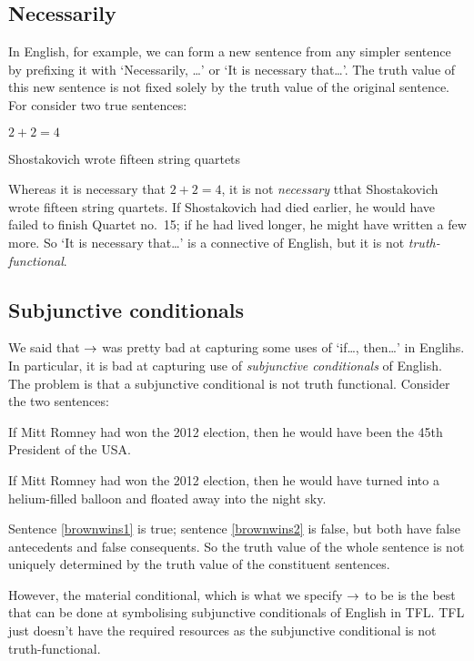 \subsection{Necessarily}

In English, for example, we can form a new sentence from any simpler sentence by prefixing it with `Necessarily, \ldots' or  `It is necessary that\ldots'. The truth value of this new sentence is not fixed solely by the truth value of the original sentence. For consider two true sentences:
\begin{earg}
	\item[\ex{nec-math}] $2 + 2 = 4$
	\item[\ex{nec-music}] Shostakovich wrote fifteen string quartets
\end{earg}
Whereas it is necessary that $2 + 2 = 4$, it is not \emph{necessary} tthat Shostakovich wrote fifteen string quartets. If Shostakovich had died earlier, he would have failed to finish Quartet no.\ 15; if he had lived longer, he might have written a few more. So `It is necessary that\ldots' is a connective of English, but it is not \emph{truth-functional}.



\subsection{Subjunctive conditionals}\label{s:IndicativeSubjunctive}



We said that $\rightarrow$ was pretty bad at capturing some uses of `if\ldots, then\ldots' in Englihs. In particular, it is bad at capturing use of \emph{subjunctive conditionals} of English. The problem is that a subjunctive conditional is not truth functional.
Consider the two sentences:
\begin{earg}
	\item[\ex{brownwins1}] If Mitt Romney had won the 2012 election, then he would have been the 45th President of the USA.
	\item[\ex{brownwins2}] If Mitt Romney had won the 2012 election, then he would have turned into a helium-filled balloon and floated away into the night sky.
\end{earg}
Sentence \ref{brownwins1} is true; sentence \ref{brownwins2} is false, but both have false antecedents and false consequents. So the truth value of the whole sentence is not uniquely determined by the truth value of the constituent sentences.

However, the material conditional, which is what we specify $\rightarrow$ to be is the best that can be done at symbolising subjunctive conditionals of English in TFL. TFL just doesn't have the required resources as the subjunctive conditional is not truth-functional.



